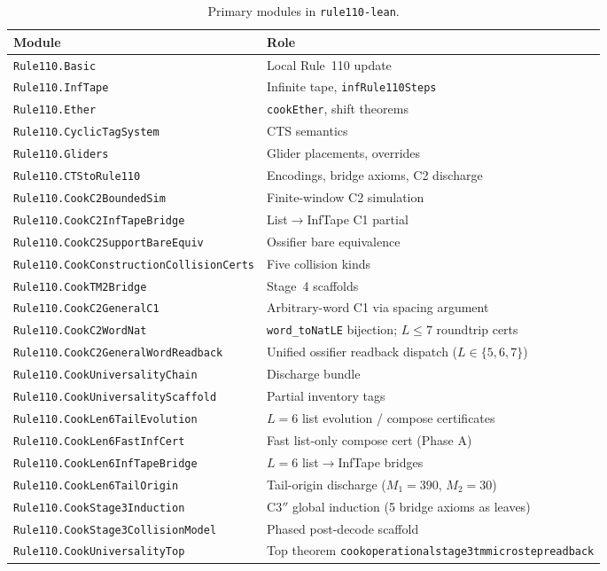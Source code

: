 \documentclass[11pt]{article}
\theoremstyle{remark}
\newcommand{\lean}[1]{%
  \penalty-100
  \begingroup\def\_{\textunderscore\allowbreak}\texttt{#1}\endgroup}
\begin{document}
\begin{appendices}
\begin{table}[H]
\centering
\caption{Primary modules in \texttt{rule110-lean}.}
\small
\renewcommand{\arraystretch}{1.1}
\begin{tabular}{@{}ll@{}}
\toprule
\textbf{Module} & \textbf{Role} \\
\midrule
\texttt{Rule110.Basic} & Local Rule~110 update \\
\texttt{Rule110.InfTape} & Infinite tape, \texttt{infRule110Steps} \\
\texttt{Rule110.Ether} & \texttt{cookEther}, shift theorems \\
\texttt{Rule110.CyclicTagSystem} & CTS semantics \\
\texttt{Rule110.Gliders} & Glider placements, overrides \\
\texttt{Rule110.CTStoRule110} & Encodings, bridge axioms, C2 discharge \\
\texttt{Rule110.CookC2BoundedSim} & Finite-window C2 simulation \\
\texttt{Rule110.CookC2InfTapeBridge} & List$\to$InfTape C1 partial \\
\texttt{Rule110.CookC2SupportBareEquiv} & Ossifier bare equivalence \\
\texttt{Rule110.CookConstructionCollisionCerts} & Five collision kinds \\
\texttt{Rule110.CookTM2Bridge} & Stage~4 scaffolds \\
\texttt{Rule110.CookC2GeneralC1} & Arbitrary-word C1 via spacing argument \\
\texttt{Rule110.CookC2WordNat} & \texttt{word\_toNatLE} bijection; $L \le 7$ roundtrip certs \\
\texttt{Rule110.CookC2GeneralWordReadback} & Unified ossifier readback dispatch ($L \in \{5,6,7\}$) \\
\texttt{Rule110.CookUniversalityChain} & Discharge bundle \\
\texttt{Rule110.CookUniversalityScaffold} & Partial inventory tags \\
\texttt{Rule110.CookLen6TailEvolution} & $L{=}6$ list evolution / compose certificates \\
\texttt{Rule110.CookLen6FastInfCert} & Fast list-only compose cert (Phase A) \\
\texttt{Rule110.CookLen6InfTapeBridge} & $L{=}6$ list$\to$InfTape bridges \\
\texttt{Rule110.CookLen6TailOrigin} & Tail-origin discharge ($M_1{=}390$, $M_2{=}30$) \\
\texttt{Rule110.CookStage3Induction} & C3$''$ global induction (5 bridge axioms as leaves) \\
\texttt{Rule110.CookStage3CollisionModel} & Phased post-decode scaffold \\
\texttt{Rule110.CookUniversalityTop} & Top theorem \lean{cook\_operational\_stage3\_tm\_microstep\_readback} \\
\bottomrule
\end{tabular}
\end{table}


\end{appendices}
\end{document}
